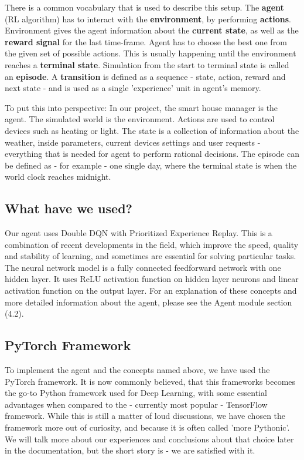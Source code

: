 \documentclass{article}
\begin{document}
There is a common vocabulary that is used to describe this setup. The \textbf{agent} (RL algorithm) has to interact with the \textbf{environment}, by performing \textbf{actions}. Environment gives the agent information about the \textbf{current state}, as well as the \textbf{reward signal} for the last time-frame. Agent has to choose the best one from the given set of possible actions. This is usually happening until the environment reaches a \textbf{terminal state}. Simulation from the start to terminal state is called an \textbf{episode}. A \textbf{transition} is defined as a sequence - state, action, reward and next state - and is used as a single 'experience' unit in agent's memory. 

To put this into perspective: In our project, the smart house manager is the agent. The simulated world is the environment. Actions are used to control devices such as heating or light. The state is a collection of information about the weather, inside parameters, current devices settings and user requests - everything that is needed for agent to perform rational decisions. The episode can be defined as - for example - one single day, where the terminal state is when the world clock reaches midnight.
\subsection{What have we used?}
Our agent uses Double DQN with Prioritized Experience Replay. This is a combination of recent developments in the field, which improve the speed, quality and stability of learning, and sometimes are essential for solving particular tasks. The neural network model is a fully connected feedforward network with one hidden layer. It uses ReLU activation function on hidden layer neurons and linear activation function on the output layer. For an explanation of these concepts and more detailed information about the agent, please see the Agent module section (4.2).
\subsection{PyTorch Framework}
To implement the agent and the concepts named above, we have used the PyTorch framework. It is now commonly believed, that this frameworks becomes the go-to Python framework used for Deep Learning, with some essential advantages when compared to the - currently most popular - TensorFlow framework. While this is still a matter of loud discussions, we have chosen the framework more out of curiosity, and because it is often called 'more Pythonic'. We will talk more about our experiences and conclusions about that choice later in the documentation, but the short story is - we are satisfied with it.
\end{document}
